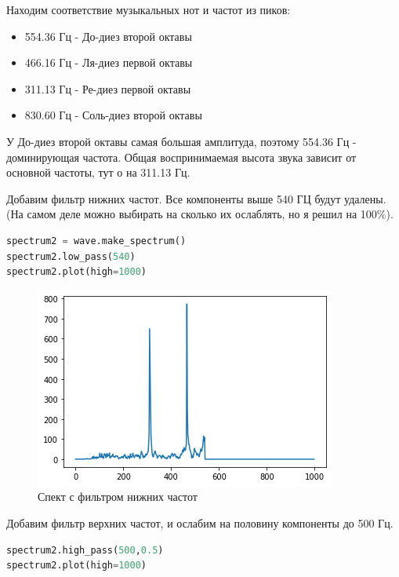 Находим соответствие музыкальных нот и частот из пиков:
\begin{itemize}
\item 554.36 Гц - До-диез второй октавы
\item 466.16 Гц - Ля-диез первой октавы
\item 311.13 Гц - Ре-диез первой октавы
\item 830.60 Гц - Соль-диез второй октавы
\end{itemize}
У До-диез второй октавы самая большая амплитуда, поэтому 554.36 Гц - доминирующая частота. Общая воспринимаемая высота звука зависит от основной частоты, тут о
на 311.13 Гц.

Добавим фильтр нижних частот. Все компоненты выше 540 ГЦ будут удалены. (На самом деле можно выбирать на сколько их ослаблять, но я решил на 100\%).

\begin{lstlisting}[language=Python]
spectrum2 = wave.make_spectrum()
spectrum2.low_pass(540)
spectrum2.plot(high=1000)
\end{lstlisting}

\begin{figure}[H]
	\begin{center}
		\includegraphics[scale=1]{fig/lab01/lab01_21_0.png}
		\caption{Спект с фильтром нижних частот}
	\end{center}
\end{figure}

Добавим фильтр верхних частот, и ослабим на половину компоненты до 500 Гц.

\begin{lstlisting}[language=Python]
spectrum2.high_pass(500,0.5)
spectrum2.plot(high=1000)
\end{lstlisting}

